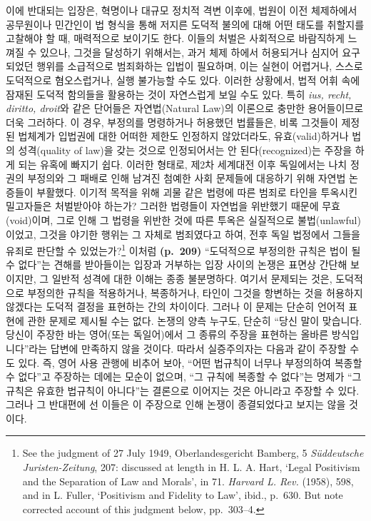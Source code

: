 이에 반대되는 입장은, 혁명이나 대규모 정치적 격변 이후에, 법원이 이전
체제하에서 공무원이나 민간인이 법 형식을 통해 저지른 도덕적 불의에 대해
어떤 태도를 취할지를 고찰해야 할 때, 매력적으로 보이기도 한다. 이들의
처벌은 사회적으로 바람직하게 느껴질 수 있으나, 그것을 달성하기 위해서는,
과거 체제 하에서 허용되거나 심지어 요구되었던 행위를 소급적으로
범죄화하는 입법이 필요하며, 이는 실현이 어렵거나, 스스로 도덕적으로
혐오스럽거나, 실행 불가능할 수도 있다. 이러한 상황에서, 법적 어휘 속에
잠재된 도덕적 함의들을 활용하는 것이 자연스럽게 보일 수도 있다. 특히
\emph{ius, recht, diritto, droit}와 같은 단어들은 자연법(Natural Law)의
이론으로 충만한 용어들이므로 더욱 그러하다. 이 경우, 부정의를 명령하거나
허용했던 법률들은, 비록 그것들이 제정된 법체계가 입법권에 대한 어떠한
제한도 인정하지 않았더라도, 유효(valid)하거나 법의 성격(quality of
law)을 갖는 것으로 인정되어서는 안 된다(recognized)는 주장을 하게 되는
유혹에 빠지기 쉽다. 이러한 형태로, 제2차 세계대전 이후 독일에서는 나치
정권의 부정의와 그 패배로 인해 남겨진 첨예한 사회 문제들에 대응하기 위해
자연법 논증들이 부활했다. 이기적 목적을 위해 괴물 같은 법령에 따른
범죄로 타인을 투옥시킨 밀고자들은 처벌받아야 하는가? 그러한 법령들이
자연법을 위반했기 때문에 무효(void)이며, 그로 인해 그 법령을 위반한 것에
따른 투옥은 실질적으로 불법(unlawful)이었고, 그것을 야기한 행위는 그
자체로 범죄였다고 하여, 전후 독일 법정에서 그들을 유죄로 판단할 수
있었는가?\footnote{See the judgment of 27 July 1949, Oberlandesgericht
  Bamberg, 5 \emph{Süddeutsche Juristen-Zeitung}, 207: discussed at
  length in H. L. A. Hart, `Legal Positivism and the Separation of Law
  and Morals', in 71. \emph{Harvard L. Rev.} (1958), 598, and in L.
  Fuller, `Positivism and Fidelity to Law', ibid., p.~630. But note
  corrected account of this judgment below, pp.~303--4.} 이처럼
\textbf{(p.~209)} ``도덕적으로 부정의한 규칙은 법이 될 수 없다''는
견해를 받아들이는 입장과 거부하는 입장 사이의 논쟁은 표면상 간단해
보이지만, 그 일반적 성격에 대한 이해는 종종 불분명하다. 여기서 문제되는
것은, 도덕적으로 부정의한 규칙을 적용하거나, 복종하거나, 타인이 그것을
항변하는 것을 허용하지 않겠다는 도덕적 결정을 표현하는  간의 차이이다. 그러나 이 문제는 단순히 언어적 표현에 관한 문제로
제시될 수는 없다. 논쟁의 양측 누구도, 단순히 ``당신 말이 맞습니다.
당신이 주장한 바는 영어(또는 독일어)에서 그 종류의 주장을 표현하는
올바른 방식입니다''라는 답변에 만족하지 않을 것이다. 따라서 실증주의자는
다음과 같이 주장할 수도 있다. 즉, 영어 사용 관행에 비추어 보아, ``어떤
법규칙이 너무나 부정의하여 복종할 수 없다''고 주장하는 데에는 모순이
없으며, ``그 규칙에 복종할 수 없다''는 명제가 ``그 규칙은 유효한
법규칙이 아니다''는 결론으로 이어지는 것은 아니라고 주장할 수 있다.
그러나 그 반대편에 선 이들은 이 주장으로 인해 논쟁이 종결되었다고 보지는
않을 것이다.

